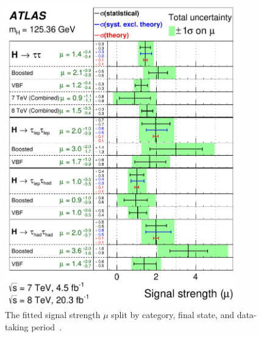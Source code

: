 \begin{figure}[tp]
  \centering
  \includegraphics[width=0.90\textwidth]{figures/HIGG-2013-32/fig_09}
  \caption{The fitted signal strength $\mu$ split by category, final state, and data-taking period~\cite{HIGG-2013-32}.}
  \label{fig:results-musummary}
\end{figure}


